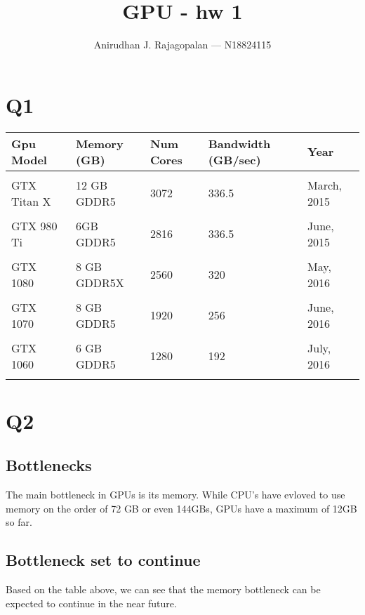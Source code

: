 \documentclass{article}
\begin{document}
\title{GPU - hw 1}
\author{Anirudhan J. Rajagopalan --- N18824115}
\maketitle

\newpage

\section{Q1}

\begin{tabulary}{\textwidth}{LLLLL}
    \bfseries
    Gpu Model & \bfseries Memory (GB) &\bfseries Num Cores &\bfseries Bandwidth (GB/sec) &\bfseries Year \mdseries \\
    \hline \\
    GTX Titan X~\cite{gpu:titan_x} & 12 GB GDDR5 & 3072 & 336.5 & March, 2015 \\\\
    GTX 980 Ti~\cite{gpu:980_ti} & 6GB GDDR5 & 2816 & 336.5 & June, 2015 \\\\
    GTX 1080~\cite{gpu:gtx_1080} &  8 GB GDDR5X & 2560 & 320 & May, 2016    \\\\
    GTX 1070~\cite{gpu:gtx_1070} & 8 GB GDDR5 & 1920 & 256 & June, 2016 \\\\
    GTX 1060~\cite{gpu:gtx_1060} & 6 GB GDDR5 & 1280 & 192 & July, 2016 \\\\
\end{tabulary}

\section{Q2}
\subsection{Bottlenecks}
The main bottleneck in GPUs is its memory.   While CPU's have evloved to use memory on the order of 72 GB or even 144GBs, GPUs have a maximum of 12GB so far.

\subsection{Bottleneck set to continue}
Based on the table above, we can see that the memory bottleneck can be expected to continue in the near future.
\end{document}
